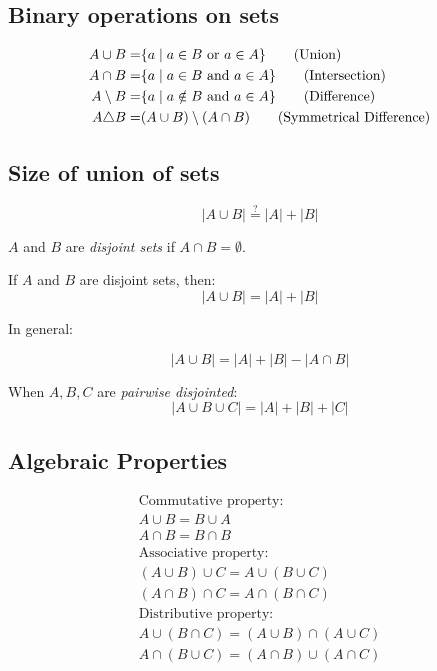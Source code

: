 \documentclass[00_complete]{subfiles}
\begin{document}
\subsection{Binary operations on sets}
\begin{align}
    A \cup B =& \{a \;|\; a \in B \text{ or } a \in A \} \tag{\text{Union}} \\
    A \cap B =& \{a \;|\; a \in B \text{ and } a \in A \}
    \tag{\text{Intersection}} \\
    A \setminus B =& \{a \;|\; a \notin B \text{ and } a \in A \}
    \tag{\text{Difference}} \\
    A \triangle B =& (A \cup B) \setminus (A \cap B) \tag{\text{Symmetrical
    Difference}}
\end{align}

\subsection{Size of union of sets}

$$|A \cup B| \overset{?}{=} |A| + |B|$$

\begin{definition}
$A$ and $B$ are \emph{disjoint sets} if $A \cap B = \emptyset$.

If $A$ and $B$ are disjoint sets, then:
$$|A \cup B| = |A| + |B|$$
\end{definition}
In general:

$$|A \cup B| = |A| + |B|- |A \cap B|$$

When $A, B, C$ are \emph{pairwise disjointed}:
$$|A \cup B \cup C| = |A| + |B| + |C|$$

\subsection{Algebraic Properties}

$$
\begin{gathered}
    \text{Commutative property:} \\
    A \cup B = B \cup A \\
    A \cap B = B \cap B \\
    \text{Associative property:} \\
    (A \cup B) \cup C = A \cup (B \cup C) \\
    (A \cap B) \cap C = A \cap (B \cap C) \\
    \text{Distributive property:} \\
    A \cup (B \cap C) = (A \cup B) \cap (A \cup C) \\
    A \cap (B \cup C) = (A \cap B) \cup (A \cap C) \\
\end{gathered}
$$
\end{document}
